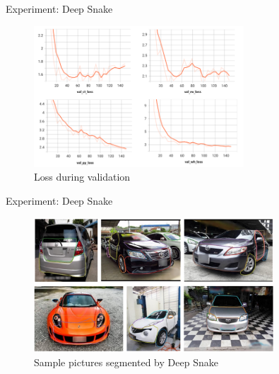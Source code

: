 \begin{frame}{Experiment: Deep Snake}
	\begin{figure}[h]
		\centering
		\includegraphics[width=0.7\textwidth]{images/val_loss.png}
		\caption{Loss during validation}
		\label{fig:val_loss}
	\end{figure}
\end{frame}

\begin{frame}{Experiment: Deep Snake}
	\begin{figure}[h]
		\centering
		\includegraphics[width=0.8\textwidth]{images/deepsnake_demo.png}
		\caption{Sample pictures segmented by Deep Snake}
		\label{fig:deepsnake_demo}
	\end{figure}
\end{frame}